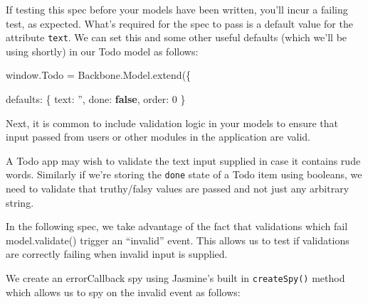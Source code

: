 \documentclass[9pt]{book}
\newenvironment{Shaded}{}{}
\newcommand{\KeywordTok}[1]{\textcolor[rgb]{0.00,0.44,0.13}{\textbf{{#1}}}}
\newcommand{\DataTypeTok}[1]{\textcolor[rgb]{0.56,0.13,0.00}{{#1}}}
\newcommand{\DecValTok}[1]{\textcolor[rgb]{0.25,0.63,0.44}{{#1}}}
\newcommand{\StringTok}[1]{\textcolor[rgb]{0.25,0.44,0.63}{{#1}}}
\newcommand{\OtherTok}[1]{\textcolor[rgb]{0.00,0.44,0.13}{{#1}}}
\newcommand{\FunctionTok}[1]{\textcolor[rgb]{0.02,0.16,0.49}{{#1}}}
\newcommand{\NormalTok}[1]{{#1}}
\begin{document}
If testing this spec before your models have been written, you'll incur
a failing test, as expected. What's required for the spec to pass is a
default value for the attribute \texttt{text}. We can set this and some
other useful defaults (which we'll be using shortly) in our Todo model
as follows:

\begin{Shaded}
\begin{Highlighting}[]
\OtherTok{window}\NormalTok{.}\FunctionTok{Todo} \NormalTok{= }\OtherTok{Backbone}\NormalTok{.}\OtherTok{Model}\NormalTok{.}\FunctionTok{extend}\NormalTok{(\{}

    \DataTypeTok{defaults}\NormalTok{: \{}
      \DataTypeTok{text}\NormalTok{: }\StringTok{''}\NormalTok{,}
      \DataTypeTok{done}\NormalTok{:  }\KeywordTok{false}\NormalTok{,}
      \DataTypeTok{order}\NormalTok{: }\DecValTok{0}
    \NormalTok{\}}
\end{Highlighting}
\end{Shaded}

Next, it is common to include validation logic in your models to ensure
that input passed from users or other modules in the application are
valid.

A Todo app may wish to validate the text input supplied in case it
contains rude words. Similarly if we're storing the \texttt{done} state
of a Todo item using booleans, we need to validate that truthy/falsy
values are passed and not just any arbitrary string.

In the following spec, we take advantage of the fact that validations
which fail model.validate() trigger an ``invalid'' event. This allows us
to test if validations are correctly failing when invalid input is
supplied.

We create an errorCallback spy using Jasmine's built in
\texttt{createSpy()} method which allows us to spy on the invalid event
as follows:
\end{document}
